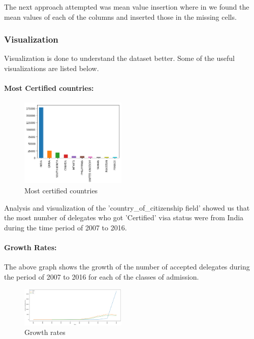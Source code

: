 \documentclass[conference]{IEEEtran}
\begin{document}
The next approach attempted was mean value insertion where in we found the mean values of each of the columns and inserted those in the missing cells.
\\
\subsubsection{\textbf{Visualization}}
Visualization is done to understand the dataset better. Some of the useful visualizations are listed below.
\paragraph{\textbf{Most Certified countries: }}
\begin{center}
\begin{figure}[h]
\includegraphics[width=0.45\textwidth]{country.png}
\caption{Most certified countries}
\label{fig:mesh1}
\end{figure}
\end{center}
Analysis and visualization of the 'country\_of\_citizenship field' showed us that the most number of delegates who got 'Certified' visa status were from India during the time period of 2007 to 2016.
\paragraph{\textbf{Growth Rates: }}
The above graph shows the growth of the number of accepted delegates during the period of 2007 to 2016 for each of the classes of admission.
\begin{center}
\begin{figure}[h]
\includegraphics[width=0.45\textwidth]{growth.png}
\caption{Growth rates}
\label{fig:mesh1}
\end{figure}
\end{center} 
\end{document}

